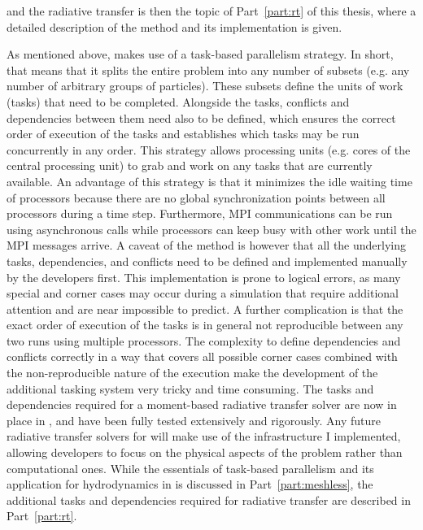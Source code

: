\GEARRT and the radiative transfer is then the topic of Part~\ref{part:rt} of this thesis, where a
detailed description of the method and its implementation is given.



As mentioned above, \swift makes use of a task-based parallelism strategy. In short, that means
that it splits the entire problem into any number of subsets (e.g. any number of arbitrary groups
of particles). These subsets define the units of work (tasks) that need to be completed. Alongside
the tasks, conflicts and dependencies between them need also to be defined, which ensures the
correct order of execution of the tasks and establishes which tasks may be run concurrently in any
order. This strategy allows processing units (e.g. cores of the central processing unit) to grab and
work on any tasks that are currently available. An advantage of this strategy is that it minimizes
the idle waiting time of processors because there are no global synchronization points between all
processors during a time step. Furthermore, MPI communications can be run using asynchronous calls
while processors can keep busy with other work until the MPI messages arrive. A caveat of the method
is however that all the underlying tasks, dependencies, and conflicts need to be defined and
implemented manually by the developers first. This implementation is prone to logical errors, as
many special and corner cases may occur during a simulation that require additional attention and
are near impossible to predict. A further complication is that the exact order of execution of the
tasks is in general not reproducible between any two runs using multiple processors. The complexity
to define dependencies and conflicts correctly in a way that covers all possible corner cases
combined with the non-reproducible nature of the execution make the development of the additional
tasking system very tricky and time consuming. The tasks and dependencies required for a
moment-based radiative transfer solver are now in place in \swift, and have been fully tested
extensively and rigorously. Any future radiative transfer solvers for \swift will make use of the
infrastructure I implemented, allowing developers to focus on the physical aspects of the problem
rather than computational ones. While the essentials of task-based parallelism and its application
for hydrodynamics in \swift is discussed in Part~\ref{part:meshless}, the additional tasks and
dependencies required for radiative transfer are described in Part~\ref{part:rt}.

